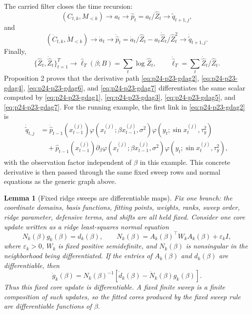 \documentclass[11pt]{article}
\newtheorem{lemma}{Lemma}
\numberwithin{equation}{section}
\begin{document}
The carried filter closes the time recursion:
\begin{equation}
    (C_{t,k},M_{<k})
    \to
    a_t
    \to
    \widehat p_t=a_t/\widehat Z_t
    \to
    \widetilde q_{t+1,j},
    \label{eq:p24-p23-gdag5}
\end{equation}
and
\begin{equation}
    (\dot C_{t,k},\dot M_{<k})
    \to
    \dot a_t
    \to
    \dot{\widehat p}_t
    =
    \dot a_t/\widehat Z_t-a_t\dot{\widehat Z}_t/\widehat Z_t^2
    \to
    \dot{\widetilde q}_{t+1,j}.
    \label{eq:p24-p23-gdag6}
\end{equation}
Finally,
\begin{equation}
    \{\widehat Z_t,\dot{\widehat Z}_t\}_{t=1}^T
    \to
    \widehat\ell_T(\beta;B)
    =
    \sum_t\log\widehat Z_t,
    \qquad
    \dot{\widehat\ell}_T
    =
    \sum_t\dot{\widehat Z}_t/\widehat Z_t.
    \label{eq:p24-p23-gdag7}
\end{equation}
Proposition 2 proves that the derivative path \eqref{eq:p24-p23-gdag2},
\eqref{eq:p24-p23-gdag4}, \eqref{eq:p24-p23-gdag6}, and \eqref{eq:p24-p23-gdag7} differentiates the same scalar
computed by \eqref{eq:p24-p23-gdag1}, \eqref{eq:p24-p23-gdag3}, \eqref{eq:p24-p23-gdag5}, and \eqref{eq:p24-p23-gdag7}.
For the running example, the first link in \eqref{eq:p24-p23-gdag2} is
\begin{equation}
\begin{aligned}
    \dot{\widetilde q}_{t,j}
    &=
    \dot{\widehat p}_{t-1}(x_{t-1}^{(j)})
    \varphi(x_t^{(j)};\beta x_{t-1}^{(j)},\sigma^2)
    \varphi(y_t;\sin x_t^{(j)},\tau_y^2)\\
    &\quad+
    \widehat p_{t-1}(x_{t-1}^{(j)})
    \partial_\beta
    \varphi(x_t^{(j)};\beta x_{t-1}^{(j)},\sigma^2)
    \varphi(y_t;\sin x_t^{(j)},\tau_y^2),
\end{aligned}
    \label{eq:p24-p23-gdag8}
\end{equation}
with the observation factor independent of \(\beta\) in this example.  This
concrete derivative is then passed through the same fixed sweep rows and
normal equations as the generic graph above.

\begin{lemma}[Fixed ridge sweeps are differentiable maps]
Fix one branch: the coordinate domains, basis functions, fitting points,
weights, ranks, sweep order, ridge parameter, defensive terms, and shifts are
all held fixed.  Consider one core update written as a ridge least-squares
normal equation
\[
    N_k(\beta)g_k(\beta)=d_k(\beta),
    \qquad
    N_k(\beta)=A_k(\beta)^\top W_k A_k(\beta)+\varepsilon_k I,
\]
where \(\varepsilon_k>0\), \(W_k\) is fixed positive semidefinite, and
\(N_k(\beta)\) is nonsingular in the neighborhood being differentiated.  If the
entries of \(A_k(\beta)\) and \(d_k(\beta)\) are differentiable, then
\[
    \dot g_k(\beta)
    =
    N_k(\beta)^{-1}
    \left[
    \dot d_k(\beta)-\dot N_k(\beta)g_k(\beta)
    \right].
\]
Thus this fixed core update is differentiable.  A fixed finite sweep is a
finite composition of such updates, so the fitted cores produced by the fixed
sweep rule are differentiable functions of \(\beta\).
\end{lemma}
\end{document}
